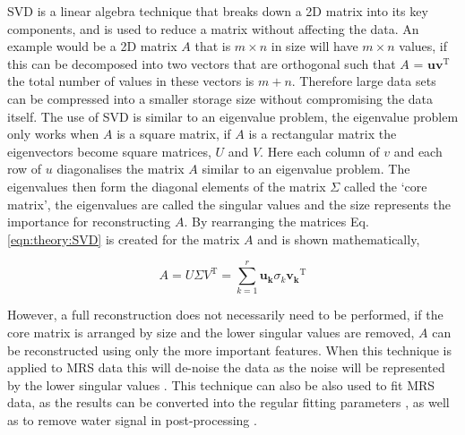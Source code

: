\ac{SVD} is a linear algebra technique that breaks down a 2D matrix into its key components, and is used to reduce a matrix without affecting the data. An example would be a 2D matrix $A$ that is $m \times n$ in size will have $m \times n$ values, if this can be decomposed into two vectors that are orthogonal such that $A$ = $\mathbf{uv}^\textrm{T}$ the total number of values in these vectors is $m+n$. Therefore large data sets can be compressed into a smaller storage size without compromising the data itself. The use of \ac{SVD} is similar to an eigenvalue problem, the eigenvalue problem only works when $A$ is a square matrix, if $A$ is a rectangular matrix the eigenvectors become square matrices, $U$ and $V$. Here each column of $v$ and each row of $u$ diagonalises the matrix $A$ similar to an eigenvalue problem. The eigenvalues then form the diagonal elements of the matrix $\Sigma$ called the `core matrix', the eigenvalues are called the singular values and the size represents the importance for reconstructing $A$. By rearranging the matrices Eq. \ref{eqn:theory:SVD} is created for the matrix $A$ \cite{Strang2016TheDecomposition} and is shown mathematically,


\begin{equation}
    A = U\Sigma V^\textrm{T} = \sum_{k=1}^{r} \mathbf{u_k}\sigma_k\mathbf{v_k}^\textrm{T}
    \label{eqn:theory:SVD}
\end{equation}

\noindent However, a full reconstruction does not necessarily need to be performed, if the core matrix is arranged by size and the lower singular values are removed, $A$ can be reconstructed using only the more important features. When this technique is applied to \ac{MRS} data this will de-noise the data as the noise will be represented by the lower singular values \cite{Brender2019DynamicHyperpolarization}. This technique can also be also used to fit \ac{MRS} data, as the results can be converted into the regular fitting parameters \cite{Pijnappel1992SVD-basedSignals}, as well as to remove water signal in post-processing \cite{Cabanes2001OptimizationBrain}.

